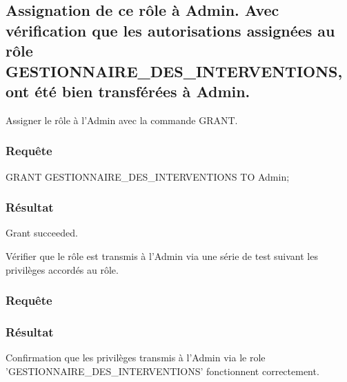 \documentclass[•]{article}
\begin{document}
\subsection{Assignation de ce rôle à Admin. Avec vérification que les autorisations assignées au rôle GESTIONNAIRE\_DES\_INTERVENTIONS, ont été bien transférées à Admin.}

\textrm{Assigner le rôle à l'Admin avec la commande GRANT.}
\subsubsection{Requête}
\begin{sql}
GRANT GESTIONNAIRE_DES_INTERVENTIONS TO Admin;
\end{sql}
\subsubsection{Résultat}
\begin{sql}
Grant succeeded.
\end{sql}

\textrm{Vérifier que le rôle est transmis à l'Admin via une série de test suivant les privilèges accordés au rôle.}
\subsubsection{Requête}
\begin{sql}

\end{sql}
\subsubsection{Résultat}
\begin{sql}

\end{sql}

\textrm{Confirmation que les privilèges transmis à l'Admin via le role 'GESTIONNAIRE\_DES\_INTERVENTIONS' fonctionnent correctement.}
\end{document}
